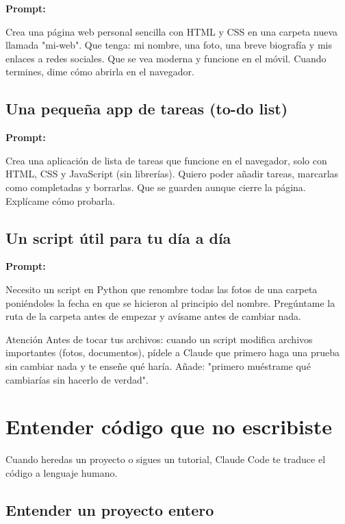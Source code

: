\documentclass[11pt,a4paper]{report}
\begin{document}
\noindent\textbf{Prompt: }
\begin{codebox}
Crea una página web personal sencilla con HTML y CSS en una carpeta nueva llamada "mi-web". Que tenga: mi nombre, una foto, una breve biografía y mis enlaces a redes sociales. Que se vea moderna y funcione en el móvil. Cuando termines, dime cómo abrirla en el navegador.
\end{codebox}

\subsection{Una pequeña app de tareas (to-do list)}

\noindent\textbf{Prompt: }
\begin{codebox}
Crea una aplicación de lista de tareas que funcione en el navegador, solo con HTML, CSS y JavaScript (sin librerías). Quiero poder añadir tareas, marcarlas como completadas y borrarlas. Que se guarden aunque cierre la página. Explícame cómo probarla.
\end{codebox}

\subsection{Un script útil para tu día a día}

\noindent\textbf{Prompt: }
\begin{codebox}
Necesito un script en Python que renombre todas las fotos de una carpeta poniéndoles la fecha en que se hicieron al principio del nombre. Pregúntame la ruta de la carpeta antes de empezar y avísame antes de cambiar nada.
\end{codebox}

\begin{calloutbox}{Atención}
Antes de tocar tus archivos: cuando un script modifica archivos importantes (fotos, documentos), pídele a Claude que primero haga una prueba sin cambiar nada y te enseñe qué haría. Añade: "primero muéstrame qué cambiarías sin hacerlo de verdad".\end{calloutbox}

\section{ Entender código que no escribiste}

Cuando heredas un proyecto o sigues un tutorial, Claude Code te traduce el código a lenguaje humano.

\subsection{Entender un proyecto entero}
\end{document}
